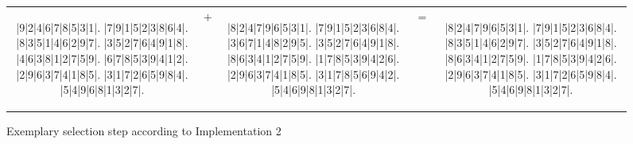 \begin{figure}[h]
  \centering
  {\setlength{\tabcolsep}{-9pt}
  \renewcommand{\arraystretch}{1.5}
   \begin{tabular}{c c c c c}
    \begin{adjustbox}{width=0.38\textwidth,valign=c}
      \begin{minipage}{\linewidth}
        \begin{sudoku}
          |9|2|4|6|7|8|5|3|1|.
          |7|9|1|5|2|3|8|6|4|.
          |8|3|5|1|4|6|2|9|7|.
          |3|5|2|7|6|4|9|1|8|.
          |4|6|3|8|1|2|7|5|9|.
          |6|7|8|5|3|9|4|1|2|.
          |2|9|6|3|7|4|1|8|5|.
          |3|1|7|2|6|5|9|8|4|.
          |5|4|9|6|8|1|3|2|7|.
        \end{sudoku}
      \end{minipage}
    \end{adjustbox}
    & %
    {\begin{adjustbox}{valign=c}\Large$+$\end{adjustbox}}
    &
    \begin{adjustbox}{width=0.38\textwidth,valign=c}
      \begin{minipage}{\linewidth}
        \begin{sudoku}
          |8|2|4|7|9|6|5|3|1|.
          |7|9|1|5|2|3|6|8|4|.
          |3|6|7|1|4|8|2|9|5|.
          |3|5|2|7|6|4|9|1|8|.
          |8|6|3|4|1|2|7|5|9|.
          |1|7|8|5|3|9|4|2|6|.
          |2|9|6|3|7|4|1|8|5|.
          |3|1|7|8|5|6|9|4|2|.
          |5|4|6|9|8|1|3|2|7|.
        \end{sudoku}
      \end{minipage}
    \end{adjustbox}
    & %
    {\begin{adjustbox}{valign=c}\Large$=$\end{adjustbox}}
    &
    \begin{adjustbox}{width=0.38\textwidth,valign=c}
      \begin{minipage}{\linewidth}
        \begin{sudoku}
          |8|2|4|7|9|6|5|3|1|.
          |7|9|1|5|2|3|6|8|4|.
          |8|3|5|1|4|6|2|9|7|.
          |3|5|2|7|6|4|9|1|8|.
          |8|6|3|4|1|2|7|5|9|.
          |1|7|8|5|3|9|4|2|6|.
          |2|9|6|3|7|4|1|8|5|.
          |3|1|7|2|6|5|9|8|4|.
          |5|4|6|9|8|1|3|2|7|.
        \end{sudoku}
      \end{minipage}
    \end{adjustbox}
   \end{tabular}
  }
  \caption{Exemplary selection step according to Implementation 2}
  \label{fig:impl-2-selection}
\end{figure}


